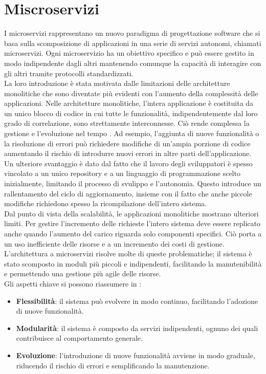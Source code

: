 \section{Miscroservizi}
I microservizi rappresentano un nuovo paradigma di progettazione software che si basa sulla scomposizione di applicazioni in una serie di servizi autonomi, chiamati microservizi.
Ogni microservizio ha un obiettivo specifico e può essere gestito in modo indipendente dagli altri mantenendo comunque la capacità di interagire con gli altri tramite protocolli standardizzati.
\\La loro introduzione è stata motivata dalle limitazioni delle architetture monolitiche che sono diventate più evidenti con l'aumento della complessità delle applicazioni. 
Nelle architetture monolitiche, l'intera applicazione è costituita da un unico blocco di codice in cui tutte le funzionalità, indipendentemente dal loro grado di correlazione, sono strettamente interconnesse.
Ciò rende complessa la gestione e l'evoluzione nel tempo \cite{dragoni2017}. 
Ad esempio, l'aggiunta di nuove funzionalità o la risoluzione di errori può richiedere modifiche di
un'ampia porzione di codice aumentando il rischio di introdurre nuovi errori in altre parti dell'applicazione.
Un ulteriore svantaggio è dato dal fatto che il lavoro degli sviluppatori è spesso vincolato a un unico repository  
e a un linguaggio di programmazione scelto inizialmente, limitando il processo di svulippo e l'autonomia.
Questo introduce un rallentamento del ciclo di aggiornamento, insieme con il fatto che anche piccole modifiche richiedono spesso la ricompilazione dell'intero sistema.
\\Dal punto di vista della scalabilità, le applicazioni monolitiche mostrano ulteriori limiti.
Per gestire l'incremento delle richieste l'intero sistema deve essere replicato anche quando l'aumento del carico riguarda solo componenti specifici.
Ciò porta a un uso inefficiente delle risorse e a un incremento dei costi di gestione.
\\L'architettura a microservizi risolve molte di queste problematiche;
il sistema è stato scomposto in moduli più piccoli e indipendenti, facilitando la manutenibilità e permettendo una gestione più agile delle risorse.
\\Gli aspetti chiave si possono riassumere in \cite{dragoni2017}:
\begin{itemize}
    \item \textbf{Flessibilità}: il sistema può evolvere in modo continuo, facilitando l'adozione di nuove funzionalità.
    \item \textbf{Modularità}: il sistema è composto da servizi indipendenti, ognuno dei quali contribuisce al comportamento generale.
    \item \textbf{Evoluzione}: l'introduzione di nuove funzionalità avviene in modo graduale, riducendo il rischio di errori e semplificando la manutenzione.
\end{itemize}
